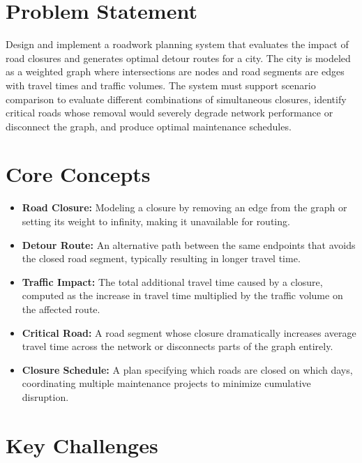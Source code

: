 \section{Problem Statement}

Design and implement a roadwork planning system that evaluates the impact of road closures and generates optimal detour routes for a city. The city is modeled as a weighted graph where intersections are nodes and road segments are edges with travel times and traffic volumes. The system must support scenario comparison to evaluate different combinations of simultaneous closures, identify critical roads whose removal would severely degrade network performance or disconnect the graph, and produce optimal maintenance schedules.

\section{Core Concepts}

\begin{itemize}
  \item \textbf{Road Closure:} Modeling a closure by removing an edge from the graph or setting its weight to infinity, making it unavailable for routing.
  \item \textbf{Detour Route:} An alternative path between the same endpoints that avoids the closed road segment, typically resulting in longer travel time.
  \item \textbf{Traffic Impact:} The total additional travel time caused by a closure, computed as the increase in travel time multiplied by the traffic volume on the affected route.
  \item \textbf{Critical Road:} A road segment whose closure dramatically increases average travel time across the network or disconnects parts of the graph entirely.
  \item \textbf{Closure Schedule:} A plan specifying which roads are closed on which days, coordinating multiple maintenance projects to minimize cumulative disruption.
\end{itemize}

\section{Key Challenges}

